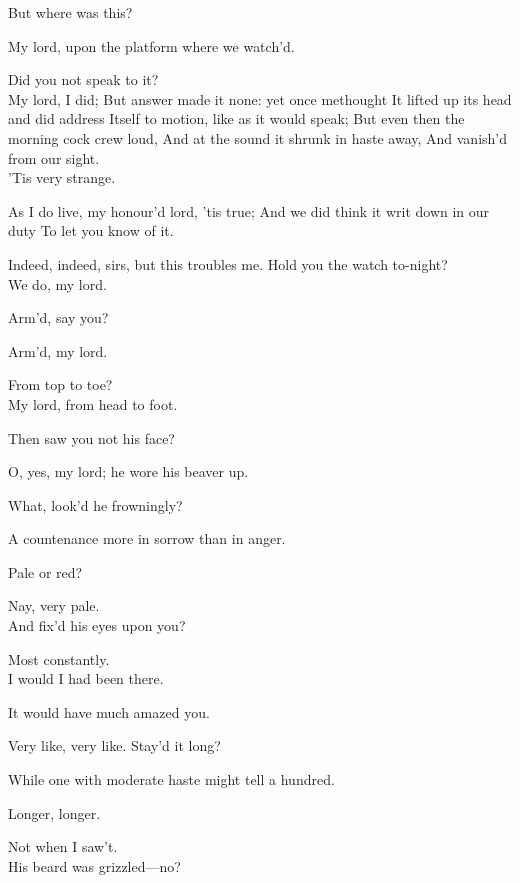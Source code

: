 \documentclass[11pt]{book}
\begin{document}
\1	But where was this?

	My lord, upon the platform where we watch'd.

\1	Did you not speak to it? \\

\6	My lord, I did;
	But answer made it none: yet once methought
	It lifted up its head and did address
	Itself to motion, like as it would speak;
	But even then the morning cock crew loud,
	And at the sound it shrunk in haste away,
	And vanish'd from our sight. \\

\1	'Tis very strange.

\6	As I do live, my honour'd lord, 'tis true;
	And we did think it writ down in our duty
	To let you know of it.

\1	Indeed, indeed, sirs, but this troubles me.
	Hold you the watch to-night? \\


 	We do, my lord.


\1	Arm'd, say you?


	Arm'd, my lord.


\1	From top to toe? \\


   My lord, from head to foot.


\1	Then saw you not his face?

\6	O, yes, my lord; he wore his beaver up.

\1	What, look'd he frowningly?

\6	A countenance more in sorrow than in anger.

\1	Pale or red?

\6	Nay, very pale. \\

\1	                  And fix'd his eyes upon you?

\6	Most constantly. \\

\1	                  I would I had been there.

\6	It would have much amazed you.

\1	Very like, very like. Stay'd it long?

\6	While one with moderate haste might tell a hundred.


	 Longer, longer.


\6	Not when I saw't. \\

\1	                  His beard was grizzled---no?
\end{document}
